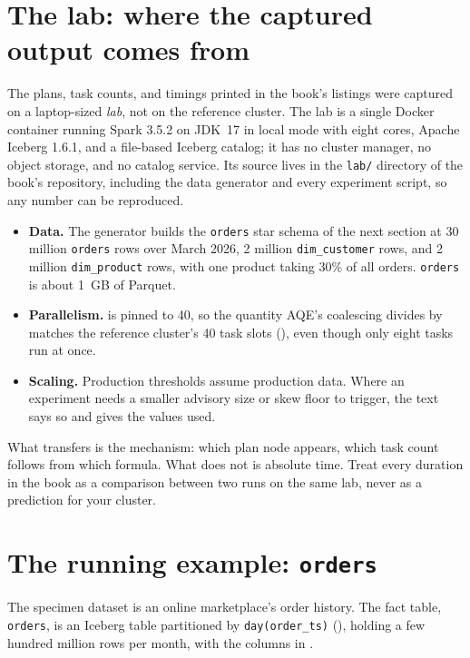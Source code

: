 \section{The lab: where the captured output comes from}
\label{sec:refenv-lab}

The plans, task counts, and timings printed in the book's listings were captured
on a laptop-sized \emph{lab}, not on the reference cluster. The lab is a single
Docker container running Spark 3.5.2 on JDK~17 in local mode with eight cores,
Apache Iceberg 1.6.1, and a file-based Iceberg catalog; it has no cluster manager,
no object storage, and no catalog service. Its source lives in the \texttt{lab/} directory of the book's
repository, including the data generator and every experiment script, so any
number can be reproduced.

\begin{itemize}
  \item \textbf{Data.} The generator builds the \texttt{orders} star schema of
        the next section at 30 million \texttt{orders} rows over March 2026,
        2 million \texttt{dim\_customer} rows, and 2 million \texttt{dim\_product}
        rows, with one product taking 30\% of all orders. \texttt{orders} is
        about 1~GB of Parquet.
  \item \textbf{Parallelism.}  is pinned to 40,
        so the quantity AQE's coalescing divides by matches the reference
        cluster's 40 task slots (), even though only
        eight tasks run at once.
  \item \textbf{Scaling.} Production thresholds assume production data. Where an
        experiment needs a smaller advisory size or skew floor to trigger, the
        text says so and gives the values used.
\end{itemize}

What transfers is the mechanism: which plan node appears, which task count
follows from which formula. What does not is absolute time. Treat every
duration in the book as a comparison between two runs on the same lab, never as
a prediction for your cluster.

\section{The running example: \texttt{orders}}
\label{sec:refenv-orders}

The specimen dataset is an online marketplace's order history. The fact
table, \texttt{orders}, is an Iceberg table partitioned by
\texttt{day(order\_ts)} (), holding a few hundred
million rows per month, with the columns in .

